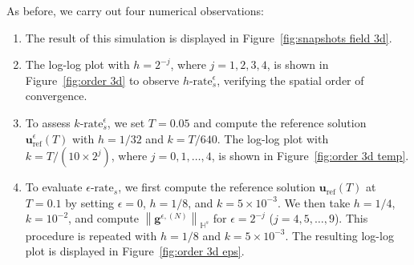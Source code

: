\documentclass[11pt,reqno]{amsart}
\theoremstyle{definition}
\numberwithin{equation}{section}
\newcommand{\bff}{\boldsymbol}
\newcommand{\bb}{\mathbb}
\newcommand{\norm}[2]{\left\|{#1}\right\|_{#2}}
\begin{document}
{
As before, we carry out four numerical observations:
\begin{enumerate}
\item[(O1)] The result of this simulation is displayed in Figure~\ref{fig:snapshots field 3d}. 

\item[(O2)] The log-log plot with $h=2^{-j}$, where $j=1,2,3,4$, is shown in Figure~\ref{fig:order 3d} to observe $h\text{-rate}_s^\epsilon$, verifying the spatial order of convergence.

\item[(O3)] To assess $k\text{-rate}_s^\epsilon$, we set $T=0.05$ and compute the reference solution $\bff{u}^\epsilon_{\mathrm{ref}}(T)$ with $h=1/32$ and $k=T/640$. The log-log plot with $k=T/(10\times 2^j)$, where $j=0,1,\ldots,4$, is shown in Figure~\ref{fig:order 3d temp}.


\item[(O4)] To evaluate $\epsilon\text{-rate}_s$, we first compute the reference solution $\bff{u}_\mathrm{ref}(T)$ at $T=0.1$ by setting $\epsilon=0$, $h=1/8$, and $k=5\times 10^{-3}$. We then take $h=1/4$, $k=10^{-2}$, and compute $\norm{\bff{g}^{\epsilon, (N)}}{\bb{H}^s}$ for $\epsilon=2^{-j}$ ($j=4,5,\ldots, 9$). This procedure is repeated with $h=1/8$ and $k=5\times 10^{-3}$. The resulting log-log plot is displayed in Figure~\ref{fig:order 3d eps}.

\end{enumerate}
}
\end{document}
